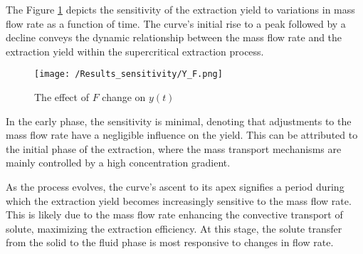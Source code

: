 \documentclass[../Article_Sensitivity_Analsysis.tex]{subfiles}
\begin{document}
	
	The Figure \ref{fig:Sensitivty_F_y} depicts the sensitivity of the extraction yield to variations in mass flow rate  as a function of time. The curve’s initial rise to a peak followed by a decline conveys the dynamic relationship between the mass flow rate and the extraction yield within the supercritical extraction process.
	
	\begin{figure}[h!]
		\centering
		\texttt{[image: /Results\_sensitivity/Y\_F.png]}
		\caption{The effect of $F$ change on $y(t)$}
		\label{fig:Sensitivty_F_y}
	\end{figure}
	
	In the early phase, the sensitivity is minimal, denoting that adjustments to the mass flow rate have a negligible influence on the yield. This can be attributed to the initial phase of the extraction, where the mass transport mechanisms are mainly controlled by a high concentration gradient.
	
	As the process evolves, the curve's ascent to its apex signifies a period during which the extraction yield becomes increasingly sensitive to the mass flow rate. This is likely due to the mass flow rate enhancing the convective transport of solute, maximizing the extraction efficiency. At this stage, the solute transfer from the solid to the fluid phase is most responsive to changes in flow rate.
	
\end{document}
